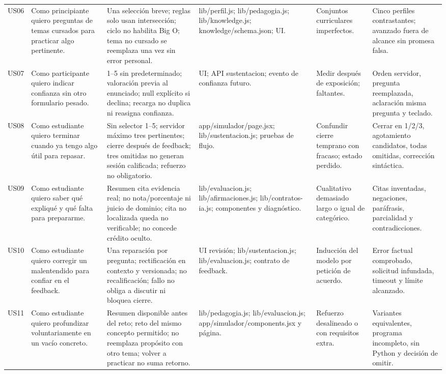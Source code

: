 \documentclass[11pt,a4paper]{report}
\begin{document}
\begin{landscape}
\begin{longtable}{P{0.9cm}P{4.6cm}P{6.2cm}P{4.4cm}P{3.2cm}P{3.8cm}}
US06 & Como principiante quiero preguntas de temas cursados para practicar algo pertinente. & Una selección breve; reglas solo usan intersección; ciclo no habilita Big O; tema no cursado se reemplaza una vez sin error personal. & lib/perfil.js; lib/pedagogia.js; lib/knowledge.js; knowledge/schema.json; UI. & Conjuntos curriculares imperfectos. & Cinco perfiles contrastantes; avanzado fuera de alcance sin promesa falsa.\\
US07 & Como participante quiero indicar confianza sin otro formulario pesado. & 1--5 sin predeterminado; valoración previa al enunciado; null explícito si declina; recarga no duplica ni reasigna confianza. & UI; API sustentacion; evento de confianza futuro. & Medir después de exposición; faltantes. & Orden servidor, pregunta reemplazada, aclaración misma pregunta y teclado.\\
US08 & Como estudiante quiero terminar cuando ya tengo algo útil para repasar. & Sin selector 1--5; servidor máximo tres pertinentes; cierre después de feedback; tres omitidas no generan sesión calificada; refuerzo no obligatorio. & app/simulador/page.jsx; lib/sustentacion.js; pruebas de flujo. & Confundir cierre temprano con fracaso; estado perdido. & Cerrar en 1/2/3, agotamiento candidatos, todas omitidas, corrección sintáctica.\\
US09 & Como estudiante quiero saber qué expliqué y qué falta para prepararme. & Resumen cita evidencia real; no nota/porcentaje ni juicio de dominio; cita no localizada queda no verificable; no concede crédito oculto. & lib/evaluacion.js; lib/afirmaciones.js; lib/contratos-ia.js; componentes y diagnóstico. & Cualitativo demasiado largo o igual de categórico. & Citas inventadas, negaciones, paráfrasis, parcialidad y contradicciones.\\
US10 & Como estudiante quiero corregir un malentendido para confiar en el feedback. & Una reparación por pregunta; rectificación en contexto y versionada; no recalificación; fallo no obliga a discutir ni bloquea cierre. & UI revisión; lib/sustentacion.js; lib/evaluacion.js; contrato de feedback. & Inducción del modelo por petición de acuerdo. & Error factual comprobado, solicitud infundada, timeout y límite alcanzado.\\
US11 & Como estudiante quiero profundizar voluntariamente en un vacío concreto. & Resumen disponible antes del reto; reto del mismo concepto permitido; no reemplaza propósito con otro tema; volver a practicar no suma retorno. & lib/pedagogia.js; lib/evaluacion.js; app/simulador/components.jsx y página. & Refuerzo desalineado o con requisitos extra. & Variantes equivalentes, programa incompleto, sin Python y decisión de omitir.\\

\end{longtable}
\end{landscape}
\end{document}
